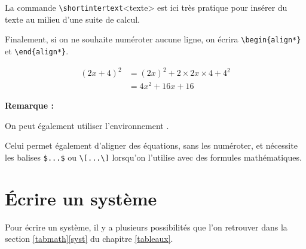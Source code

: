 \begin{info}
    La commande \texttt{\textbackslash shortintertext}<texte> est ici très pratique pour insérer du texte au milieu d'une suite de calcul.
\end{info}

Finalement, si on ne souhaite numéroter aucune ligne, on écrira \verb!\begin{align*}! et \verb!\end{align*}!.\bigskip

{
\begin{SideBySideExample}
    \begin{align*}
        (2x+4)^2&=(2x)^2+2\times 2x\times 4+4^2 \\
                &=4x^2+16x+16
    \end{align*}
\end{SideBySideExample}
}

\medskip

\textbf{Remarque :}

On peut également utiliser l'environnement .

Celui permet également d'aligner des équations, sans les numéroter, et nécessite les balises \verb!$...$! ou \verb!\[...\]! lorsqu'on l'utilise avec des formules mathématiques.

\section{Écrire un système}

Pour écrire un système, il y a plusieurs possibilités que l'on retrouver dans la section \ref{tabmath}\ref{syst} du chapitre \ref{tableaux}.